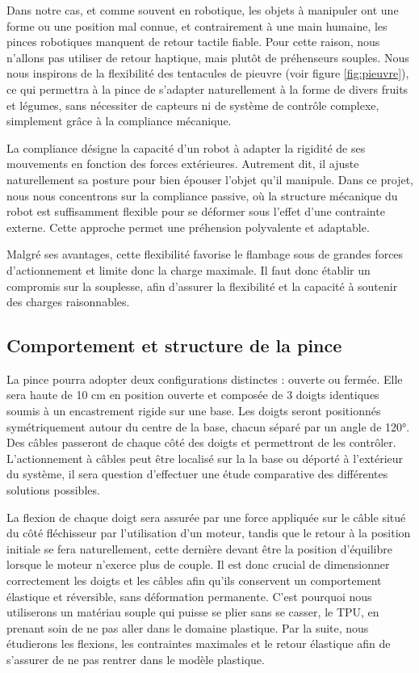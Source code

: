 \documentclass[a4paper, 11pt]{report}
\begin{document}
        Dans notre cas, et comme souvent en robotique, les objets à manipuler ont une forme ou une position mal connue, et contrairement à une main humaine, les pinces robotiques manquent de retour tactile fiable. Pour cette raison, nous n'allons pas utiliser de retour haptique, mais plutôt de préhenseurs souples. Nous nous inspirons de la flexibilité des tentacules de pieuvre (voir figure \ref{fig:pieuvre}), ce qui permettra à la pince de s'adapter naturellement à la forme de divers fruits et légumes, sans nécessiter de capteurs ni de système de contrôle complexe, simplement grâce à la compliance mécanique.
        
        La compliance désigne la capacité d’un robot à adapter la rigidité de ses mouvements en fonction des forces extérieures. Autrement dit, il ajuste naturellement sa posture pour bien épouser l’objet qu’il manipule. Dans ce projet, nous nous concentrons sur la compliance passive, où la structure mécanique du robot est suffisamment flexible pour se déformer sous l'effet d'une contrainte externe. Cette approche permet une préhension polyvalente et adaptable. \cite{noauthor_gestion_2016}

        Malgré ses avantages, cette flexibilité favorise le flambage sous de grandes forces d'actionnement et limite donc la charge maximale. Il faut donc établir un compromis sur la souplesse, afin d'assurer la flexibilité et la capacité à soutenir des charges raisonnables. \cite{wang_spirobs_2025}
    
    \subsection{Comportement et structure de la pince}
    
        La pince pourra adopter deux configurations distinctes : ouverte ou fermée. Elle sera haute de 10 cm en position ouverte et composée de 3 doigts identiques soumis à un encastrement rigide sur une base. Les doigts seront positionnés symétriquement autour du centre de la base, chacun séparé par un angle de 120°. Des câbles passeront de chaque côté des doigts et permettront de les contrôler. L'actionnement à câbles peut être localisé sur la la base ou déporté à l'extérieur du système, il sera question d'effectuer une étude comparative des différentes solutions possibles.
        
        La flexion de chaque doigt sera assurée par une force appliquée sur le câble situé du côté fléchisseur par l'utilisation d'un moteur, tandis que le retour à la position initiale se fera naturellement, cette dernière devant être la position d'équilibre lorsque le moteur n'exerce plus de couple. Il est donc crucial de dimensionner correctement les doigts et les câbles afin qu'ils conservent un comportement élastique et réversible, sans déformation permanente. C'est pourquoi nous utiliserons un matériau souple qui puisse se plier sans se casser, le TPU, en prenant soin de ne pas aller dans le domaine plastique. Par la suite, nous étudierons les flexions, les contraintes maximales et le retour élastique afin de s'assurer de ne pas rentrer dans le modèle plastique.
                
\end{document}
